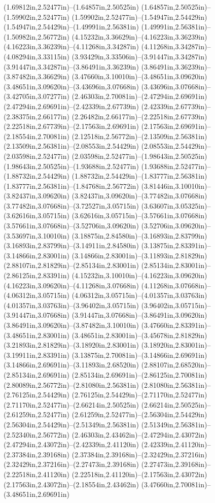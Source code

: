 (1.69812in,2.52477in)--(1.64857in,2.50525in) (1.64857in,2.50525in)--(1.59902in,2.52477in) (1.59902in,2.52477in)--(1.54947in,2.54429in) (1.54947in,2.54429in)--(1.49991in,2.56381in) (1.49991in,2.56381in)--(1.50982in,2.56772in) (4.15232in,3.36629in)--(4.16223in,3.36239in) (4.16223in,3.36239in)--(4.11268in,3.34287in) (4.11268in,3.34287in)--(4.08294in,3.33115in) (3.93429in,3.33506in)--(3.91447in,3.34287in) (3.91447in,3.34287in)--(3.86491in,3.36239in) (3.86491in,3.36239in)--(3.87482in,3.36629in) (3.47660in,3.10010in)--(3.48651in,3.09620in) (3.48651in,3.09620in)--(3.43696in,3.07668in) (3.43696in,3.07668in)--(3.42705in,3.07277in) (2.46303in,2.70081in)--(2.47294in,2.69691in) (2.47294in,2.69691in)--(2.42339in,2.67739in) (2.42339in,2.67739in)--(2.38375in,2.66177in) (2.26482in,2.66177in)--(2.22518in,2.67739in) (2.22518in,2.67739in)--(2.17563in,2.69691in) (2.17563in,2.69691in)--(2.18554in,2.70081in) (2.12518in,2.56772in)--(2.13509in,2.56381in) (2.13509in,2.56381in)--(2.08553in,2.54429in) (2.08553in,2.54429in)--(2.03598in,2.52477in) (2.03598in,2.52477in)--(1.98643in,2.50525in) (1.98643in,2.50525in)--(1.93688in,2.52477in) (1.93688in,2.52477in)--(1.88732in,2.54429in) (1.88732in,2.54429in)--(1.83777in,2.56381in) (1.83777in,2.56381in)--(1.84768in,2.56772in) (3.81446in,3.10010in)--(3.82437in,3.09620in) (3.82437in,3.09620in)--(3.77482in,3.07668in) (3.77482in,3.07668in)--(3.72527in,3.05715in) (3.63607in,3.05325in)--(3.62616in,3.05715in) (3.62616in,3.05715in)--(3.57661in,3.07668in) (3.57661in,3.07668in)--(3.52706in,3.09620in) (3.52706in,3.09620in)--(3.53697in,3.10010in) (3.18875in,2.84580in)--(3.16893in,2.83799in) (3.16893in,2.83799in)--(3.14911in,2.84580in) (3.13875in,2.83391in)--(3.14866in,2.83001in) (3.14866in,2.83001in)--(3.11893in,2.81829in) (2.88107in,2.81829in)--(2.85134in,2.83001in) (2.85134in,2.83001in)--(2.86125in,2.83391in) (4.15232in,3.10010in)--(4.16223in,3.09620in) (4.16223in,3.09620in)--(4.11268in,3.07668in) (4.11268in,3.07668in)--(4.06312in,3.05715in) (4.06312in,3.05715in)--(4.01357in,3.03763in) (4.01357in,3.03763in)--(3.96402in,3.05715in) (3.96402in,3.05715in)--(3.91447in,3.07668in) (3.91447in,3.07668in)--(3.86491in,3.09620in) (3.86491in,3.09620in)--(3.87482in,3.10010in) (3.47660in,2.83391in)--(3.48651in,2.83001in) (3.48651in,2.83001in)--(3.45678in,2.81829in) (3.21893in,2.81829in)--(3.18920in,2.83001in) (3.18920in,2.83001in)--(3.19911in,2.83391in) (3.13875in,2.70081in)--(3.14866in,2.69691in) (3.14866in,2.69691in)--(3.11893in,2.68520in) (2.88107in,2.68520in)--(2.85134in,2.69691in) (2.85134in,2.69691in)--(2.86125in,2.70081in) (2.80089in,2.56772in)--(2.81080in,2.56381in) (2.81080in,2.56381in)--(2.76125in,2.54429in) (2.76125in,2.54429in)--(2.71170in,2.52477in) (2.71170in,2.52477in)--(2.66214in,2.50525in) (2.66214in,2.50525in)--(2.61259in,2.52477in) (2.61259in,2.52477in)--(2.56304in,2.54429in) (2.56304in,2.54429in)--(2.51349in,2.56381in) (2.51349in,2.56381in)--(2.52340in,2.56772in) (2.46303in,2.43462in)--(2.47294in,2.43072in) (2.47294in,2.43072in)--(2.42339in,2.41120in) (2.42339in,2.41120in)--(2.37384in,2.39168in) (2.37384in,2.39168in)--(2.32429in,2.37216in) (2.32429in,2.37216in)--(2.27473in,2.39168in) (2.27473in,2.39168in)--(2.22518in,2.41120in) (2.22518in,2.41120in)--(2.17563in,2.43072in) (2.17563in,2.43072in)--(2.18554in,2.43462in) (3.47660in,2.70081in)--(3.48651in,2.69691in) 